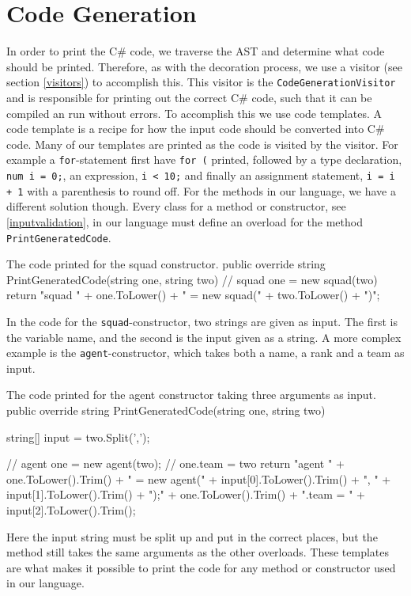 \section{Code Generation}
In order to print the C\# code, we traverse the AST and determine what code should be printed. 
Therefore, as with the decoration process, we use a visitor (see section \ref{visitors}) to accomplish this.
This visitor is the \texttt{CodeGenerationVisitor} and is responsible for printing out the correct C\# code, such that it can be compiled an run without errors. 
To accomplish this we use code templates. \newline
A code template is a recipe for how the input code should be converted into C\# code. 
Many of our templates are printed as the code is visited by the visitor. 
For example a \texttt{for}-statement first have \texttt{for (} printed, followed by a type declaration, \texttt{num i = 0;}, an expression, \texttt{i < 10;} and finally an assignment statement, \texttt{i = i + 1} with a parenthesis to round off. \newline
For the methods in our language, we have a different solution though. 
Every class for a method or constructor, see \ref{inputvalidation}, in our language must define an overload for the method \texttt{PrintGeneratedCode}. 

\begin{source}{The code printed for the squad constructor.}{}
public override string PrintGeneratedCode(string one, string two)
        {
            // squad one = new squad(two)
            return "squad " + one.ToLower() + " = new squad(" + two.ToLower() + ")";
        }
\end{source}

In the code for the \texttt{squad}-constructor, two strings are given as input. 
The first is the variable name, and the second is the input given as a string. 
A more complex example is the \texttt{agent}-constructor, which takes both a name, a rank and a team as input.

\begin{source}{The code printed for the agent constructor taking three arguments as input.}{}
public override string PrintGeneratedCode(string one, string two)
        {
            string[] input = two.Split(',');
						
            // agent one = new agent(two);
            // one.team = two
            return "agent " + one.ToLower().Trim() + 
							" = new agent(" + input[0].ToLower().Trim() + 
							", " + input[1].ToLower().Trim() + ");\n" + 
							one.ToLower().Trim() + ".team = " + 
							input[2].ToLower().Trim();
        }
\end{source}

Here the input string must be split up and put in the correct places, but the method still takes the same arguments as the other overloads. 
These templates are what makes it possible to print the code for any method or constructor used in our language.